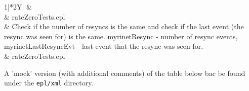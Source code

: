 \begin{tabularx}{1\textwidth}{|*{2}{Y|}}
	\hline
	 & \\
	& rateZeroTests.epl\\


	\hline
	 & 
	Check if the number of resyncs is the same and check if the last event (the resync was seen for) is the same. myrinetResync - number of resync events, myrinetLastResyncEvt - last event that the resync was seen for.\\
	& rateZeroTests.epl\\


\end{tabularx}



A 'mock' version (with additional comments) of the table below bac be found under the \texttt{epl/xml} directory.







